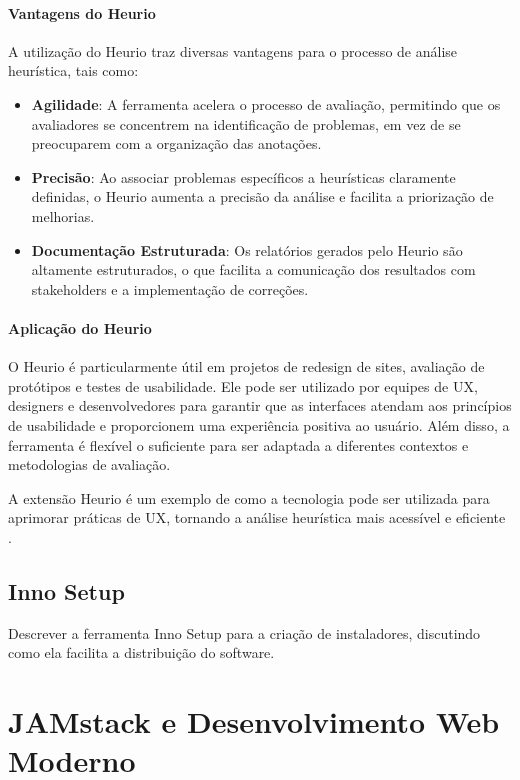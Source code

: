 \paragraph{Vantagens do Heurio}
A utilização do Heurio traz diversas vantagens para o processo de análise heurística, tais como:

\begin{itemize}
    \item \textbf{Agilidade}: A ferramenta acelera o processo de avaliação, permitindo que os avaliadores se concentrem na identificação de problemas, em vez de se preocuparem com a organização das anotações.
    
    \item \textbf{Precisão}: Ao associar problemas específicos a heurísticas claramente definidas, o Heurio aumenta a precisão da análise e facilita a priorização de melhorias.
    
    \item \textbf{Documentação Estruturada}: Os relatórios gerados pelo Heurio são altamente estruturados, o que facilita a comunicação dos resultados com stakeholders e a implementação de correções.
\end{itemize}

\paragraph{Aplicação do Heurio}
O Heurio é particularmente útil em projetos de redesign de sites, avaliação de protótipos e testes de usabilidade. Ele pode ser utilizado por equipes de \gls{UX}, designers e desenvolvedores para garantir que as interfaces atendam aos princípios de usabilidade e proporcionem uma experiência positiva ao usuário. Além disso, a ferramenta é flexível o suficiente para ser adaptada a diferentes contextos e metodologias de avaliação.

A extensão Heurio é um exemplo de como a tecnologia pode ser utilizada para aprimorar práticas de UX, tornando a análise heurística mais acessível e eficiente \cite{Heurio2023}.

\subsection{Inno Setup}
Descrever a ferramenta Inno Setup para a criação de instaladores, discutindo como ela facilita a distribuição do software.
    \section{JAMstack e Desenvolvimento Web Moderno}
    \label{sec:jamstack}

